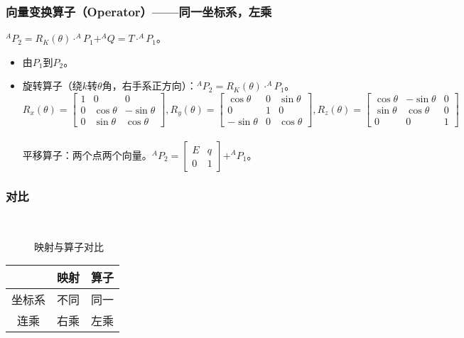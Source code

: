 \documentclass[
12pt, %
a4paper, 
oneside, %
headinclude,footinclude, %
]{scrartcl}
\begin{document}
\subsubsection{向量变换算子（Operator）——同一坐标系，左乘}
$ ^A P_2 = R_K(\theta) \cdot ^A P_1 + ^A Q= T \cdot ^A P_1 $。
\begin{itemize}
\item 由$ P_1 $到$ P_2 $。
\item 旋转算子（绕$ k $转$ \theta $角，右手系正方向）：$ ^A P_2 = R_K(\theta) \cdot ^AP_1 $。 \\
$$
R_x(\theta) = \begin{bmatrix} 1 & 0 & 0 \\ 0 & \cos\theta & -\sin\theta \\ 0 & \sin\theta & \cos\theta \end{bmatrix}, 
R_y(\theta) = \begin{bmatrix} \cos\theta & 0 & \sin\theta \\ 0 & 1 & 0 \\ -\sin\theta & 0 & \cos\theta \end{bmatrix}, 
R_z(\theta) = \begin{bmatrix} \cos\theta & -\sin\theta & 0 \\ \sin\theta & \cos\theta & 0 \\ 0 & 0 & 1 \end{bmatrix}
$$ \\
平移算子：两个点两个向量。$ ^A P_2 = \begin{bmatrix} E & q \\ 0 & 1 \end{bmatrix} + ^A P_1 $。
\end{itemize}
\subsubsection{对比}
\begin{minipage}{0.58\textwidth}
\begin{figure}[H]
\centering
{} \quad
{}\\
 \quad
{}
\caption[映射与算子对比]{映射与算子对比}
\end{figure}
\end{minipage}
\hfill
\begin{minipage}{0.38\textwidth}
\centering
{}
\begin{tabular}{c|cc}
\hline
& 映射 & 算子 \\
\hline
坐标系 & 不同 & 同一 \\
连乘 & 右乘 & 左乘 \\
\hline
\end{tabular}
\end{minipage}
\end{document}
